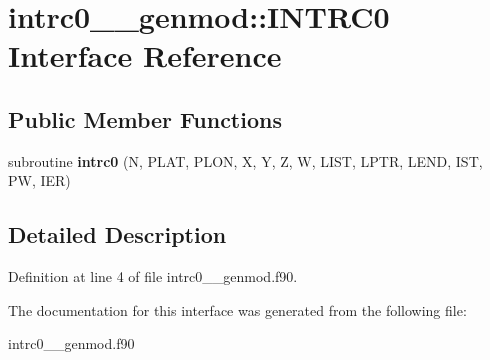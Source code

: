 \hypertarget{interfaceintrc0____genmod_1_1_i_n_t_r_c0}{\section{intrc0\+\_\+\+\_\+genmod\+:\+:I\+N\+T\+R\+C0 Interface Reference}
\label{interfaceintrc0____genmod_1_1_i_n_t_r_c0}
}
\subsection*{Public Member Functions}
\begin{DoxyCompactItemize}
\item 
\hypertarget{interfaceintrc0____genmod_1_1_i_n_t_r_c0_a83b9466cf14458488ca838dbdb42de9c}{subroutine {\bfseries intrc0} (N, P\+L\+A\+T, P\+L\+O\+N, X, Y, Z, W, L\+I\+S\+T, L\+P\+T\+R, L\+E\+N\+D, I\+S\+T, P\+W, I\+E\+R)}\label{interfaceintrc0____genmod_1_1_i_n_t_r_c0_a83b9466cf14458488ca838dbdb42de9c}

\end{DoxyCompactItemize}


\subsection{Detailed Description}


Definition at line 4 of file intrc0\+\_\+\+\_\+genmod.\+f90.



The documentation for this interface was generated from the following file\+:\begin{DoxyCompactItemize}
\item 
intrc0\+\_\+\+\_\+genmod.\+f90\end{DoxyCompactItemize}
